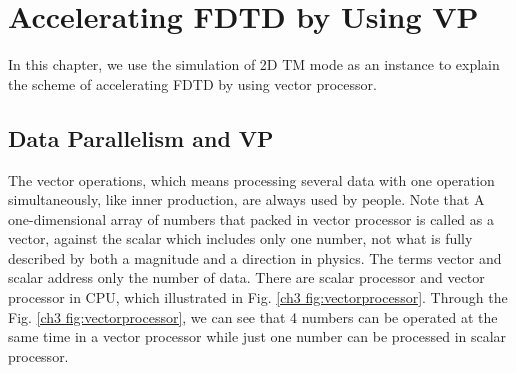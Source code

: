 
\chapter{Accelerating FDTD by Using VP}

In this chapter, we use the simulation of 2D TM mode as an instance to explain the scheme of accelerating FDTD by using vector processor.

\section{Data Parallelism and VP}

The vector operations, which means processing several data with one operation simultaneously, like inner production, are always used by people. Note that A one-dimensional array of numbers that packed in vector processor is called as a vector, against the scalar which includes only one number, not what is fully described by both a magnitude and a direction in physics. The terms vector and scalar address only the number of data. There are scalar processor and vector processor in CPU, which illustrated in Fig. \ref{ch3 fig:vectorprocessor}. Through the Fig. \ref{ch3 fig:vectorprocessor}, we can see that 4 numbers can be operated at the same time in a vector processor while just one number can be processed in scalar processor. 

